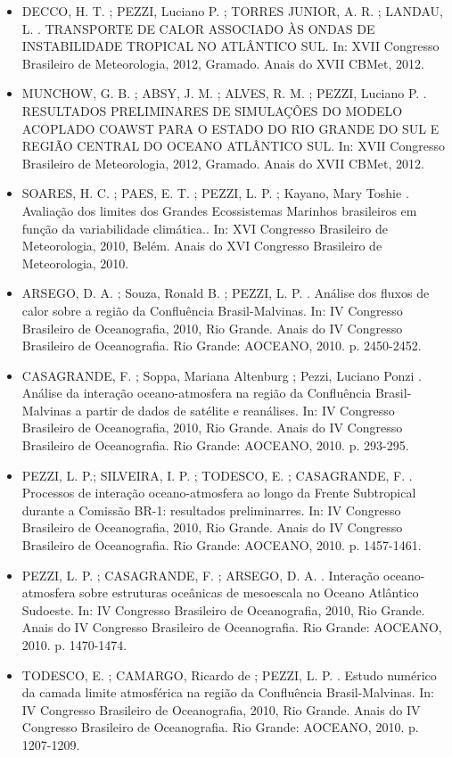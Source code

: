 \documentclass[11pt, a4paper]{awesome-cv}
\begin{document}
\begin{cvletter}
\begin{itemize}
  \item[] DECCO, H. T. ; PEZZI, Luciano P. ; TORRES JUNIOR, A. R. ; LANDAU, L. . TRANSPORTE DE CALOR ASSOCIADO ÀS ONDAS DE INSTABILIDADE TROPICAL NO ATLÂNTICO SUL. In: XVII Congresso Brasileiro de Meteorologia, 2012, Gramado. Anais do XVII CBMet, 2012.
  \item[] MUNCHOW, G. B. ; ABSY, J. M. ; ALVES, R. M. ; PEZZI, Luciano P. . RESULTADOS PRELIMINARES DE SIMULAÇÕES DO MODELO ACOPLADO COAWST PARA O ESTADO DO RIO GRANDE DO SUL E REGIÃO CENTRAL DO OCEANO ATLÂNTICO SUL. In: XVII Congresso Brasileiro de Meteorologia, 2012, Gramado. Anais do XVII CBMet, 2012. 
  \item[] SOARES, H. C. ; PAES, E. T. ; PEZZI, L. P. ; Kayano, Mary Toshie . Avaliação dos limites dos Grandes Ecossistemas Marinhos brasileiros em função da variabilidade climática.. In: XVI Congresso Brasileiro de Meteorologia, 2010, Belém. Anais do XVI Congresso Brasileiro de Meteorologia, 2010.
  \item[] ARSEGO, D. A. ; Souza, Ronald B. ; PEZZI, L. P. . Análise dos fluxos de calor sobre a região da Confluência Brasil-Malvinas. In: IV Congresso Brasileiro de Oceanografia, 2010, Rio Grande. Anais do IV Congresso Brasileiro de Oceanografia. Rio Grande: AOCEANO, 2010. p. 2450-2452. 
  \item[] CASAGRANDE, F. ; Soppa, Mariana Altenburg ; Pezzi, Luciano Ponzi . Análise da interação oceano-atmosfera na região da Confluência Brasil-Malvinas a partir de dados de satélite e reanálises. In: IV Congresso Brasileiro de Oceanografia, 2010, Rio Grande. Anais do IV Congresso Brasileiro de Oceanografia. Rio Grande: AOCEANO, 2010. p. 293-295. 
  \item[] PEZZI, L. P.; SILVEIRA, I. P. ; TODESCO, E. ; CASAGRANDE, F. . Processos de interação oceano-atmosfera ao longo da Frente Subtropical durante a Comissão BR-1: resultados preliminarres. In: IV Congresso Brasileiro de Oceanografia, 2010, Rio Grande. Anais do IV Congresso Brasileiro de Oceanografia. Rio Grande: AOCEANO, 2010. p. 1457-1461. 
  \item[] PEZZI, L. P. ; CASAGRANDE, F. ; ARSEGO, D. A. . Interação oceano-atmosfera sobre estruturas oceânicas de mesoescala no Oceano Atlântico Sudoeste. In: IV Congresso Brasileiro de Oceanografia, 2010, Rio Grande. Anais do IV Congresso Brasileiro de Oceanografia. Rio Grande: AOCEANO, 2010. p. 1470-1474.
  \item[] TODESCO, E. ; CAMARGO, Ricardo de ; PEZZI, L. P. . Estudo numérico da camada limite atmosférica na região da Confluência Brasil-Malvinas. In: IV Congresso Brasileiro de Oceanografia, 2010, Rio Grande. Anais do IV Congresso Brasileiro de Oceanografia. Rio Grande: AOCEANO, 2010. p. 1207-1209.

\end{itemize}
\end{cvletter}
\end{document}
